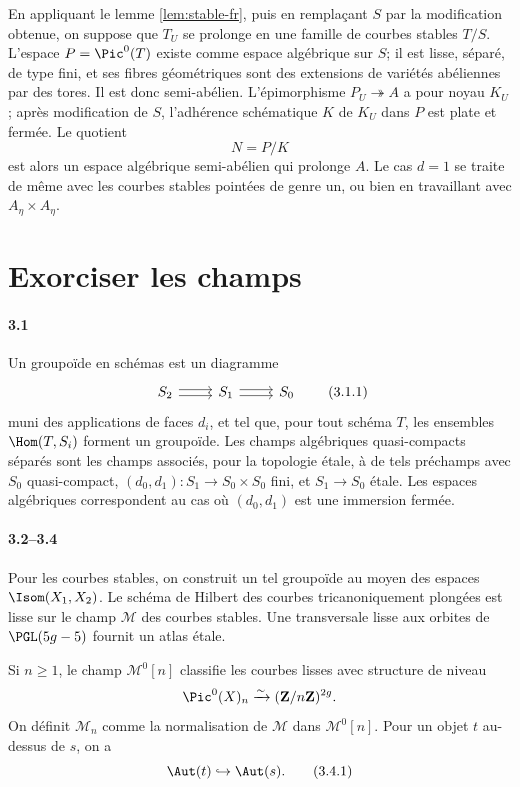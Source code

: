 En appliquant le lemme \ref{lem:stable-fr}, puis en remplaçant $S$ par la modification obtenue, on suppose que $T_U$ se prolonge en une famille de courbes stables $T/S$. L'espace $P=\Pic^0(T)$ existe comme espace algébrique sur $S$; il est lisse, séparé, de type fini, et ses fibres géométriques sont des extensions de variétés abéliennes par des tores. Il est donc semi-abélien. L'épimorphisme $P_U\twoheadrightarrow A$ a pour noyau $K_U$; après modification de $S$, l'adhérence schématique $K$ de $K_U$ dans $P$ est plate et fermée. Le quotient
\[
  N=P/K
\]
est alors un espace algébrique semi-abélien qui prolonge $A$. Le cas $d=1$ se traite de même avec les courbes stables pointées de genre un, ou bien en travaillant avec $A_\eta\times A_\eta$.

\section{Exorciser les champs}

\paragraph{3.1}
Un groupoïde en schémas est un diagramme
\[
\begin{tikzcd}
S_2 \arrow[r,shift left=.5ex] \arrow[r,shift right=.5ex] & S_1 \arrow[r,shift left=.5ex] \arrow[r,shift right=.5ex] & S_0
\end{tikzcd}
\tag{3.1.1}
\]
muni des applications de faces $d_i$, et tel que, pour tout schéma $T$, les ensembles $\Hom(T,S_i)$ forment un groupoïde. Les champs algébriques quasi-compacts séparés sont les champs associés, pour la topologie étale, à de tels préchamps avec $S_0$ quasi-compact, $(d_0,d_1):S_1\to S_0\times S_0$ fini, et $S_1\to S_0$ étale. Les espaces algébriques correspondent au cas où $(d_0,d_1)$ est une immersion fermée.

\paragraph{3.2--3.4}
Pour les courbes stables, on construit un tel groupoïde au moyen des espaces $\Isom(X_1,X_2)$. Le schéma de Hilbert des courbes tricanoniquement plongées est lisse sur le champ $\mathcal M$ des courbes stables. Une transversale lisse aux orbites de $\PGL(5g-5)$ fournit un atlas étale.

Si $n\ge1$, le champ $\mathcal M^0[n]$ classifie les courbes lisses avec structure de niveau
\[
  \Pic^0(X)_n\xrightarrow{\sim}(\mathbf Z/n\mathbf Z)^{2g}.
\]
On définit $\mathcal M_n$ comme la normalisation de $\mathcal M$ dans $\mathcal M^0[n]$. Pour un objet $t$ au-dessus de $s$, on a
\[
  \Aut(t)\hookrightarrow \Aut(s).
  \tag{3.4.1}
\]

